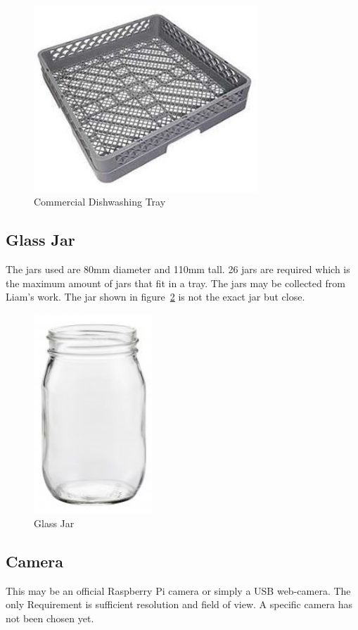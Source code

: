 \documentclass[11pt]{article}
\begin{document}
            \begin{figure}[ht]
                \centering
                \includegraphics[height=7cm]{tray.jpg}
                \caption{Commercial Dishwashing Tray}\label{fig:tray}
            \end{figure}

        \FloatBarrier
        \subsection{Glass Jar}
            The jars used are 80mm diameter and 110mm tall. 26 jars are required which is the maximum amount of jars that fit in a tray. The jars may be collected from Liam's work. The jar shown in figure~\ref{fig:jar} is not the exact jar but close.

            \begin{figure}[ht]
                \centering
                \includegraphics[height=7.5cm]{jar.jpg}
                \caption{Glass Jar}\label{fig:jar}
            \end{figure}

        \FloatBarrier
        \subsection{Camera}
            This may be an official Raspberry Pi camera or simply a USB web-camera. The only Requirement is sufficient resolution and field of view. A specific camera has not been chosen yet.
\end{document}
